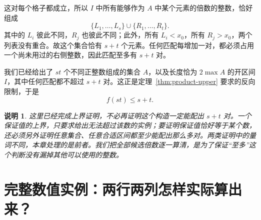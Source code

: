 \documentclass[UTF8,a4paper,oneside,openany,fontset=fandol,zihao=-4]{ctexbook}
\theoremstyle{guide}
\newtheorem{remark}[theorem]{说明}
\begin{document}
这对每个格子都成立，所以 $I$ 中所有能够作为 $A$ 中某个元素的倍数的整数，恰好组成
\[
\{L_1,\ldots,L_s\}\cup\{R_1,\ldots,R_t\}.
\]
其中的 $L_i$ 彼此不同，$R_j$ 也彼此不同；此外，所有 $L_i<x_0$，所有 $R_j>x_0$，两个列表没有重合。故这个集合恰有 $s+t$ 个元素。任何匹配每增加一对，都必须占用一个尚未用过的右侧整数，因此匹配至多有 $s+t$ 对。

我们已经给出了 $st$ 个不同正整数组成的集合 $A$，以及长度恰为 $2\max A$ 的开区间 $I$，其中任何匹配都不超过 $s+t$ 对。这正是定理~\ref{thm:product-upper} 要求的反向限制，于是
\[
\boxed{f(st)\leq s+t}.
\]

\begin{remark}\label{up:upper-only}
这里已经完成上界证明，不必再证明这个构造一定能配出 $s+t$ 对。一个保证值的上界，只要求给出无法超过该数的实例；要证明保证值恰好等于某个数，还必须另外证明任意集合、任意合适区间都至少能配出那么多对。两类证明中的量词不同，本章处理的是前者。我们把全部候选倍数逐一算清，是为了保证“至多”这个判断没有漏掉其他可以使用的整数。
\end{remark}

\section{完整数值实例：两行两列怎样实际算出来？}\label{up:example}
\end{document}
